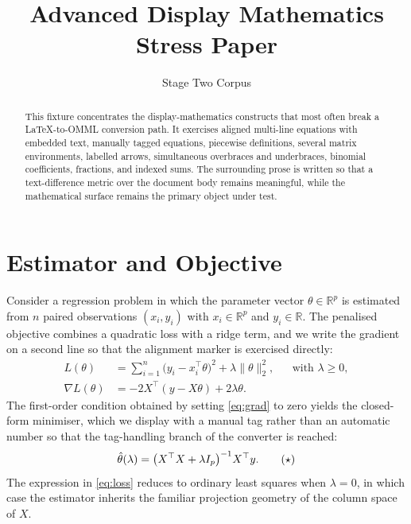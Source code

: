 \documentclass[11pt]{article}
\title{Advanced Display Mathematics Stress Paper}
\author{Stage Two Corpus}
\date{}
\begin{document}
\maketitle

\begin{abstract}
This fixture concentrates the display-mathematics constructs that most often
break a LaTeX-to-OMML conversion path. It exercises aligned multi-line
equations with embedded text, manually tagged equations, piecewise
definitions, several matrix environments, labelled arrows, simultaneous
overbraces and underbraces, binomial coefficients, fractions, and indexed
sums. The surrounding prose is written so that a text-difference metric over
the document body remains meaningful, while the mathematical surface remains
the primary object under test.
\end{abstract}

\section{Estimator and Objective}
\label{sec:objective}

Consider a regression problem in which the parameter vector
$\theta \in \mathbb{R}^{p}$ is estimated from $n$ paired observations
$(x_i, y_i)$ with $x_i \in \mathbb{R}^{p}$ and $y_i \in \mathbb{R}$. The
penalised objective combines a quadratic loss with a ridge term, and we write
the gradient on a second line so that the alignment marker is exercised
directly:
\begin{align}
L(\theta)
  &= \sum_{i=1}^{n} \bigl(y_i - x_i^{\top}\theta\bigr)^2
     + \lambda \lVert \theta \rVert_2^2,
     && \text{with } \lambda \geq 0, \label{eq:loss}\\
\nabla L(\theta)
  &= -2 X^{\top}(y - X\theta) + 2\lambda\theta. \label{eq:grad}
\end{align}
The first-order condition obtained by setting \cref{eq:grad} to zero yields the
closed-form minimiser, which we display with a manual tag rather than an
automatic number so that the tag-handling branch of the converter is reached:
\begin{equation}
\stepcounter{equation}%
\hat{\theta}(\lambda)
  = \bigl(X^{\top}X + \lambda I_p\bigr)^{-1} X^{\top} y. \tag{$\star$}
\end{equation}
The expression in \eqref{eq:loss} reduces to ordinary least squares when
$\lambda = 0$, in which case the estimator inherits the familiar projection
geometry of the column space of $X$.
\end{document}
